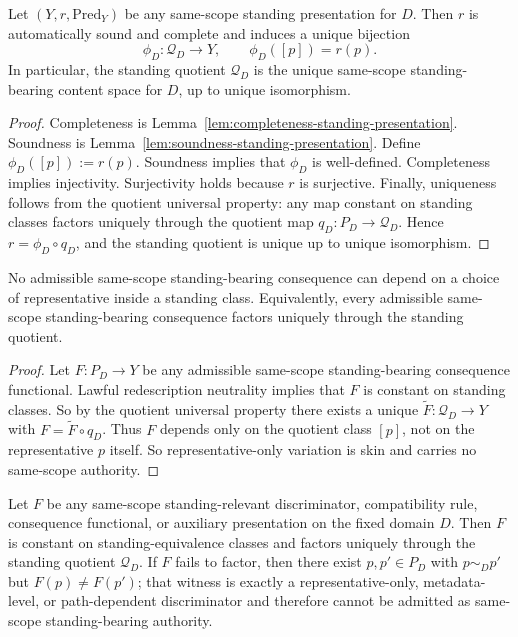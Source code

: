 \begin{theorem}
\label{thm:standing-quotient-uniqueness}
Let $(Y,r,\mathrm{Pred}_Y)$ be any same-scope standing presentation for $D$. Then $r$ is automatically sound and complete and induces a unique bijection
\[
\phi_D : \mathcal Q_D \longrightarrow Y, \qquad \phi_D([p])=r(p).
\]
In particular, the standing quotient $\mathcal Q_D$ is the unique same-scope standing-bearing content space for $D$, up to unique isomorphism.
\end{theorem}

\begin{proof}
Completeness is Lemma~\ref{lem:completeness-standing-presentation}. Soundness is Lemma~\ref{lem:soundness-standing-presentation}. Define $\phi_D([p]):=r(p)$. Soundness implies that $\phi_D$ is well-defined. Completeness implies injectivity. Surjectivity holds because $r$ is surjective. Finally, uniqueness follows from the quotient universal property: any map constant on standing classes factors uniquely through the quotient map $q_D:P_D\to \mathcal Q_D$. Hence $r=\phi_D\circ q_D$, and the standing quotient is unique up to unique isomorphism.\cite{MaleyATS}
\end{proof}

\begin{corollary}
\label{cor:skin-non-authority}
No admissible same-scope standing-bearing consequence can depend on a choice of representative inside a standing class. Equivalently, every admissible same-scope standing-bearing consequence factors uniquely through the standing quotient.
\end{corollary}

\begin{proof}
Let $F:P_D\to Y$ be any admissible same-scope standing-bearing consequence functional. Lawful redescription neutrality implies that $F$ is constant on standing classes. So by the quotient universal property there exists a unique $\widetilde F:\mathcal Q_D\to Y$ with $F=\widetilde F\circ q_D$. Thus $F$ depends only on the quotient class $[p]$, not on the representative $p$ itself. So representative-only variation is skin and carries no same-scope authority.\cite{MaleyATS}
\end{proof}

\begin{theorem}
\label{thm:same-scope-factorization-discipline}
Let $F$ be any same-scope standing-relevant discriminator, compatibility rule, consequence functional, or auxiliary presentation on the fixed domain $D$. Then $F$ is constant on standing-equivalence classes and factors uniquely through the standing quotient $\mathcal Q_D$. If $F$ fails to factor, then there exist $p,p'\in P_D$ with $p\sim_D p'$ but $F(p)\neq F(p')$; that witness is exactly a representative-only, metadata-level, or path-dependent discriminator and therefore cannot be admitted as same-scope standing-bearing authority.
\end{theorem}

